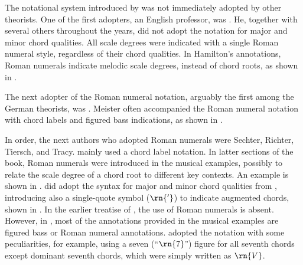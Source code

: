 

The notational system introduced by
\textcite{weber1817versuch} was not immediately adopted by
other theorists. One of the first adopters, an English
professor, was \textcite{hamilton1840catechism}. He,
together with several others throughout the years, did not
adopt the notation for major and minor chord qualities. All
scale degrees were indicated with a single Roman numeral
style, regardless of their chord qualities. In Hamilton's
annotations, Roman numerals indicate melodic scale degrees,
instead of chord roots, as shown in
.


The next adopter of the Roman numeral notation, arguably the
first among the German theorists, was
\textcite{meister1852vollstandige}. Meister often
accompanied the Roman numeral notation with chord labels and
figured bass indications, as shown in
.


In order, the next authors who adopted Roman numerals were
Sechter, Richter, Tiersch, and Tracy.
\textcite{sechter1853grundsatze} mainly used a chord label
notation. In latter sections of the book, Roman numerals
were introduced in the musical examples, possibly to relate
the scale degree of a chord root to different key contexts.
An example is shown in
.
\textcite{richter1860lehrbuch} did adopt the syntax for
major and minor chord qualities from
\textcite{weber1817versuch}, introducing also a single-quote
symbol ($\rn{'}$) to indicate augmented chords, shown in
. In the
earlier treatise of \textcite{tiersch1868system}, the use of
Roman numerals is absent. However, in
\textcite{tiersch1874elementarbuch}, most of the annotations
provided in the musical examples are figured bass or Roman
numeral annotations. \textcite{tracy1878theory} adopted the
notation with some peculiarities, for example, using a seven
(``$\rn{7}$'') figure for all seventh chords except dominant
seventh chords, which were simply written as $\rn{V}$.


